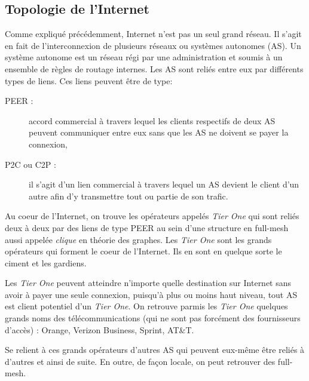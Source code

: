 

%

\subsection{Topologie de l'Internet}
\par
Comme expliqu\'e pr\'ec\'edemment, Internet n'est pas un seul grand r\'eseau. Il s'agit en fait de l'interconnexion de plusieurs r\'eseaux ou syst\`emes autonomes (AS). Un syst\`eme autonome est un r\'eseau r\'egi par une administration et soumis \`a un ensemble de r\`egles de routage internes. Les AS sont reli\'es entre eux par diff\'erents types de liens. Ces liens peuvent \^etre de type:
\begin{description}
 \item[PEER : ] accord commercial \`a travers lequel les clients respectifs de deux AS peuvent communiquer entre eux sans que les AS ne doivent se payer la connexion,
 \item[P2C ou C2P : ] il s'agit d'un lien commercial \`a travers lequel un AS devient le client d'un autre afin d'y transmettre tout ou partie de son trafic.
\end{description}
\par
Au coeur de l'Internet, on trouve les op\'erateurs appel\'es \textit{Tier One} qui sont reli\'es deux \`a deux par des liens de type PEER au sein d'une structure en full-mesh aussi appel\'ee \textit{clique} en th\'eorie des graphes. Les \textit{Tier One} sont les grands op\'erateurs qui forment le coeur de l'Internet. Ils en sont en quelque sorte le ciment et les gardiens. 
\par
 Les \textit{Tier One} peuvent atteindre n'importe quelle destination sur Internet sans avoir \`a payer une seule connexion, puisqu'\`a plus ou moins haut niveau, tout AS est client potentiel d'un \textit{Tier One}. On retrouve parmis les \textit{Tier One} quelques grands noms des télécommunications (qui ne sont pas forcément des fournisseurs d'acc\`es) : Orange, Verizon Business, Sprint, AT\&T.
\par
Se relient \`a ces grands op\'erateurs d'autres AS qui peuvent eux-m\^eme \^etre reli\'es \`a d'autres et ainsi de suite. En outre, de fa\c con locale, on peut retrouver des full-mesh.
